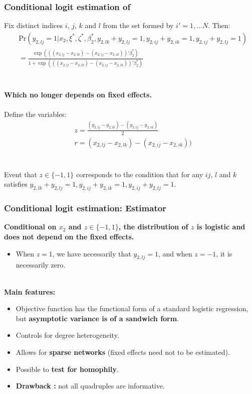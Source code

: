 \begin{frame}
    \frametitle{{Conditional logit estimation of \cite{charbonneau2017multiple}}}
    Fix distinct indices $i$, $j$, $k$ and $l$ from the set formed by $i'= 1,...N$.
    Then:
    \begin{align*} 
        &\text{Pr}(y_{2,lj} = 1 \rvert x_2, \xi^*, \zeta^*, \beta_2^*, y_{2,lk} + y_{2,lj} = 1, y_{2,ij} + y_{2,ik} = 1, y_{2,ij} + y_{2,lj} = 1) \\
        &= \frac{\exp(((x_{2,lj} - x_{2,lk}) - (x_{2,ij} - x_{2,ik}))'\beta_2^*)}{1+ \exp(((x_{2,lj} - x_{2,lk}) - (x_{2,ij} - x_{2,ik}))'\beta_2^*)} \nonumber
    \end{align*} \\~\\ \pause
    \textbf{Which no longer depends on fixed effects.} \\~\\ \pause
    Define the variables:
    \begin{align*}
        &z = \frac{(y_{2,lj} - y_{2,lk}) - (y_{2,ij} - y_{2,ik})}{2} \\
        &r = (x_{2,lj} - x_{2,lk}) - (x_{2,ij} - x_{2,ik}))
    \end{align*} \\~\\
    Event that $z \in \{-1,1\}$ corresponds to the condition that for any $ij$, $l$ and $k$ satisfies $ y_{2,lk} + y_{2,lj} = 1, y_{2,ij} + y_{2,ik} = 1, y_{2,ij} + y_{2,lj} = 1$. 
\end{frame}

\begin{frame}
    \frametitle{{Conditional logit estimation: Estimator}}
    \textbf{Conditional on $x_2$ and $z \in \{-1,1\}$, the distribution of $z$ is logistic and does not depend on the fixed effects.} \\
    \begin{itemize}
        \item When $z=1$, we have necessarily that $y_{2,lj} = 1$, and when $z=-1$, it is necessarily zero. \\~\\ \pause
    \end{itemize}

    \textbf{Main features:}
\begin{itemize}
    \item Objective function has the functional form of a standard logistic regression, but \textbf{asymptotic variance is of a sandwich form}.
    \item Controls for degree heterogeneity.
    \item Allows for \textbf{sparse networks} (fixed effects need not to be estimated).
    \item Possible to \textbf{test for homophily}.
    \item \textbf{Drawback :} not all quadruples are informative.

\end{itemize}
\hyperlink{Jochmans}{}
\end{frame}
